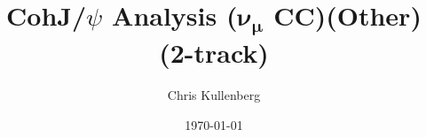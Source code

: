 \title{CohJ/$\psi$ Analysis ($\boldsymbol{\nu_\mu}$ \textbf{CC})(\textbf{Other})(\textbf{2-track})}
\author{Chris Kullenberg}
\date{\today}
